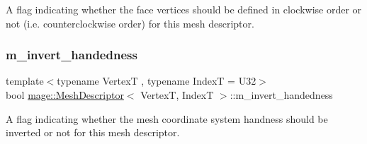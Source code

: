 A flag indicating whether the face vertices should be defined in clockwise order or not (i.\+e. counterclockwise order) for this mesh descriptor. \hypertarget{classmage_1_1_mesh_descriptor_a95491d0719f524589192d74fe5622bf8}{}\label{classmage_1_1_mesh_descriptor_a95491d0719f524589192d74fe5622bf8} 
\subsubsection{\texorpdfstring{m\+\_\+invert\+\_\+handedness}{m\_invert\_handedness}}
{\footnotesize\ttfamily template$<$typename VertexT , typename IndexT  = U32$>$ \\
bool \hyperlink{classmage_1_1_mesh_descriptor}{mage\+::\+Mesh\+Descriptor}$<$ VertexT, IndexT $>$\+::m\+\_\+invert\+\_\+handedness\hspace{0.3cm}{\ttfamily [private]}}

A flag indicating whether the mesh coordinate system handness should be inverted or not for this mesh descriptor. 